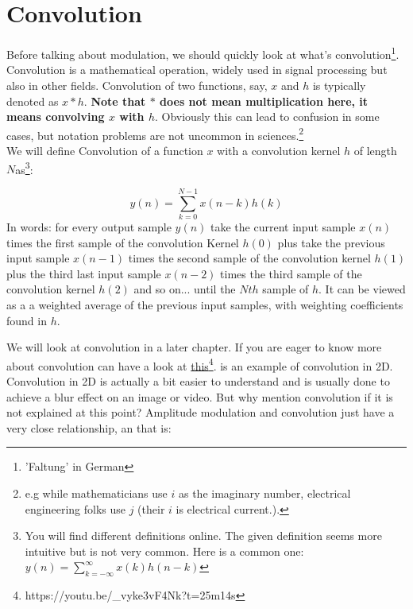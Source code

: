 






\section{Convolution}
\label{sub:conv}
Before talking about modulation, we should quickly look at what's convolution\footnote{'Faltung' in German}.\\
Convolution is a mathematical operation, widely used in signal processing but also in other fields. Convolution of two functions, say, $x$ and $h$ is typically denoted as $x*h$. \textbf{Note that $*$ does not mean multiplication here, it means convolving $x$ with $h$}. Obviously this can lead to confusion in some cases, but notation problems are not uncommon in sciences.\footnote{e.g while mathematicians use $i$ as the imaginary number, electrical engineering folks use $j$ (their $i$ is electrical current.).}\\

We will define Convolution of a function $x$ with a convolution kernel $h$ of length $N$as\footnote{You will find different definitions online. The given definition seems more intuitive but is not very common. Here is a common one:$y(n) = \sum_{k=-\infty}^{\infty} x(k) h (n-k)$}:

\begin{equation}
y(n) = \sum_{k=0}^{N-1} x(n-k) h (k)
\end{equation}
In words: for every output sample $y(n)$ take the current input sample $x(n)$ times the first sample of the convolution Kernel $h(0)$ plus take the previous input sample $x(n-1)$ times the second sample of the convolution kernel $h(1)$ plus the third last input sample $x(n-2)$ times the third sample of the convolution kernel $h(2)$ and so on... until the $Nth$ sample of $h$. It can be viewed as a a weighted average of the previous input samples, with weighting coefficients found in $h$.

We will look at convolution in a later chapter. If you  are eager to know more about convolution can have a look at
\href{https://youtu.be/_vyke3vF4Nk?t=25m14s}{this}\footnote{https://youtu.be/\_vyke3vF4Nk?t=25m14s}.  is an example of convolution in 2D. Convolution in 2D is actually a bit easier to understand and is usually done to achieve a blur effect on an image or video. But why mention convolution if it is not explained at this point? Amplitude modulation and convolution just have a very close relationship, an that is:




